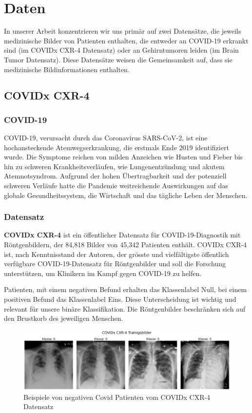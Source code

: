 \section{Daten}\label{chap:Daten}

In unserer Arbeit konzentrieren wir uns primär auf zwei Datensätze, die jeweils medizinische Bilder von Patienten enthalten, die entweder an COVID-19 erkrankt sind (im COVIDx CXR-4 Datensatz) oder an Gehirntumoren leiden (im Brain Tumor Datensatz). Diese Datensätze weisen die Gemeinsamkeit auf, dass sie medizinische Bildinformationen enthalten. 

\subsection{COVIDx CXR-4} \label{chap:COVIDX-CXR4}
\subsubsection{COVID-19} \label{chap:covid19 allgemein}
COVID-19, verursacht durch das Coronavirus SARS-CoV-2, ist eine hochansteckende Atemwegserkrankung, die erstmals Ende 2019 identifiziert wurde. Die Symptome reichen von milden Anzeichen wie Husten und Fieber bis hin zu schweren Krankheitsverläufen, wie Lungenentzündung und akutem Atemnotsyndrom. Aufgrund der hohen Übertragbarkeit und der potenziell schweren Verläufe hatte die Pandemie weitreichende Auswirkungen auf das globale Gesundheitssystem, die Wirtschaft und das tägliche Leben der Menschen. 


\subsubsection{Datensatz}
\textbf{COVIDx CXR-4} \cite{wu_covidx_2023} ist ein öffentlicher Datensatz für COVID-19-Diagnostik mit Röntgenbildern, der 84,818 Bilder von 45,342 Patienten enthält. COVIDx CXR-4 ist, nach Kenntnisstand der Autoren, der grösste und vielfältigste öffentlich verfügbare COVID-19-Datensatz für Röntgenbilder und soll die Forschung unterstützen, um Klinikern im Kampf gegen COVID-19 zu helfen.

Patienten, mit einem negativen Befund erhalten das Klassenlabel Null, bei einem positiven Befund das Klassenlabel Eins. Diese Unterscheidung ist wichtig und relevant für unsere binäre Klassifikation. Die Röntgenbilder beschränken sich auf den Brustkorb des jeweiligen Menschen.

\begin{figure}[H]
    \centering
    \includegraphics[width=\linewidth]{01-images/03-data/covid19-klasse0.png}
    \caption{Beispiele von negativen Covid Patienten vom COVIDx CXR-4 Datensatz}
    \label{fig:covid19-klasse0}
\end{figure}

